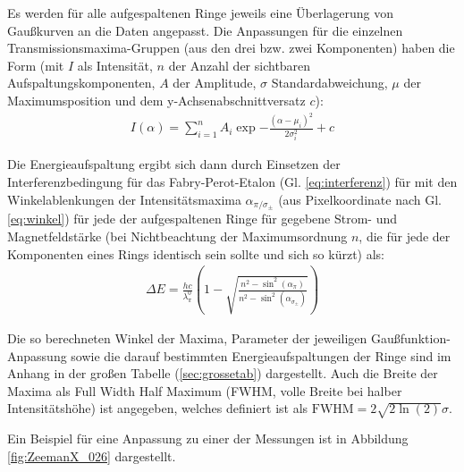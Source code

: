 Es werden für alle aufgespaltenen Ringe jeweils eine Überlagerung von Gaußkurven an die Daten angepasst. Die Anpassungen für die einzelnen Transmissionsmaxima-Gruppen (aus den drei bzw. zwei Komponenten) haben die Form (mit $I$ als Intensität, $n$ der Anzahl der sichtbaren Aufspaltungskomponenten, $A$ der Amplitude, $\sigma$ Standardabweichung, $\mu$ der Maximumsposition und dem y-Achsenabschnittversatz $c$):
\begin{align}\label{eq:supergaussian}
	I(\alpha) = \sum_{i=1}^{n} A_i \exp{-\frac{(\alpha-\mu_i)^2}{2\sigma_i^2}}+c
\end{align}

Die Energieaufspaltung ergibt sich dann durch Einsetzen der Interferenzbedingung für das Fabry-Perot-Etalon (Gl. \ref{eq:interferenz}) für mit den Winkelablenkungen der Intensitätsmaxima $\alpha_{\pi/\sigma_\pm}$ (aus Pixelkoordinate nach Gl. \ref{eq:winkel}) für jede der aufgespaltenen Ringe für gegebene Strom- und Magnetfeldstärke (bei Nichtbeachtung der Maximumsordnung $n$, die für jede der Komponenten eines Rings identisch sein sollte und sich so kürzt) als:
\begin{align}\label{eq:energieaufspaltung_formel}
	\Delta E = \frac{hc}{\lambda_\pi^0} \left( 1 - \sqrt{ \frac{n^2-\sin^2(\alpha_\pi)}{n^2-\sin^2(\alpha_{\sigma_\pm})}}\right)
\end{align}

Die so berechneten Winkel der Maxima, Parameter der jeweiligen Gaußfunktion-Anpassung sowie die darauf bestimmten Energieaufspaltungen der Ringe sind im Anhang in der großen Tabelle (\ref{sec:grossetab}) dargestellt. Auch die Breite der Maxima als Full Width Half Maximum (FWHM, volle Breite bei halber Intensitätshöhe) ist angegeben, welches definiert ist als $\text{FWHM} = 2 \sqrt{2 \ln(2)}\sigma$.


Ein Beispiel für eine Anpassung zu einer der Messungen ist in Abbildung \ref{fig:ZeemanX_026} dargestellt.

